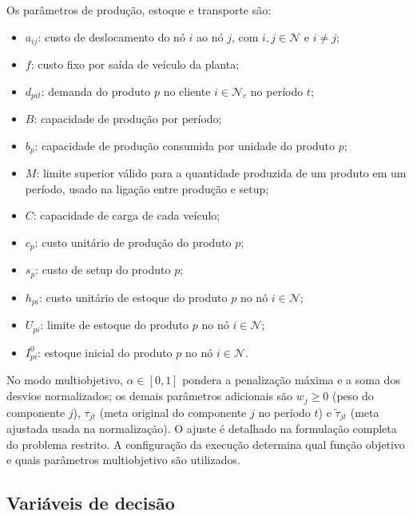 \documentclass[11pt,a4paper]{article}
\newcommand{\N}{\mathcal{N}}
\begin{document}
Os parâmetros de produção, estoque e transporte são:
\begin{itemize}
    \item $a_{ij}$: custo de deslocamento do nó $i$ ao nó $j$, com $i,j\in\N$ e $i\ne j$;
    \item $f$: custo fixo por saída de veículo da planta;
    \item $d_{pit}$: demanda do produto $p$ no cliente $i\in\N_c$ no período $t$;
    \item $B$: capacidade de produção por período;
    \item $b_p$: capacidade de produção consumida por unidade do produto $p$;
    \item $M$: limite superior válido para a quantidade produzida de um produto em um período, usado na ligação entre produção e setup;
    \item $C$: capacidade de carga de cada veículo;
    \item $c_p$: custo unitário de produção do produto $p$;
    \item $s_p$: custo de setup do produto $p$;
    \item $h_{pi}$: custo unitário de estoque do produto $p$ no nó $i\in\N$;
    \item $U_{pi}$: limite de estoque do produto $p$ no nó $i\in\N$;
    \item $I^0_{pi}$: estoque inicial do produto $p$ no nó $i\in\N$.
\end{itemize}
No modo multiobjetivo, $\alpha\in[0,1]$ pondera a penalização máxima e a soma dos desvios normalizados; os demais parâmetros adicionais são $w_j\ge0$ (peso do componente $j$), $\tau_{jt}$ (meta original do componente $j$ no período $t$) e $\widetilde\tau_{jt}$ (meta ajustada usada na normalização). O ajuste é detalhado na formulação completa do problema restrito. A configuração da execução determina qual função objetivo e quais parâmetros multiobjetivo são utilizados.

\subsection{Variáveis de decisão}
\end{document}
